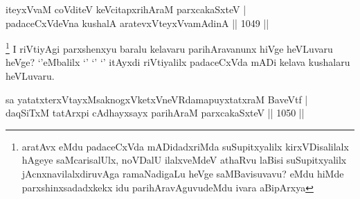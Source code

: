 \begin{shl}
iteyxVvaM coVditeV keVcitapxrihAraM parxcakaSxteV | \\
padaceCxVdeVna kushalA aratevxVteyxVvamAdinA \hfill||  1049 ||  
\end{shl}

\begin{artha}
\footnote{aratAvx eMdu padaceCxVda mADidadxriMda suSupitxyalilx kirxVDisalilalx hAgeye saMcarisalUlx, noVDalU ilalxveMdeV athaRvu laBisi suSupitxyalilx jAcnxnavilalxdiruvAga ramaNadigaLu heVge saMBavisuvavu? eMdu hiMde parxshinxsadadxkekx idu parihAravAguvudeMdu ivara aBipArxya}
I riVtiyAgi parxshenxyu baralu kelavaru parihAravanunx hiVge heVLuvaru heVge? `\stext'eMbalilx `\stext' `\stext' `\stext' itAyxdi riVtiyalilx padaceCxVda mADi kelava kushalaru heVLuvaru.
\end{artha}

 
 \begin{shl}
sa yatatxterxVtayxMsaknogxVketxVneVRdamapuyxtatxraM BaveVtf | \\
daqSiTxM tatArxpi cAdhayxsayx parihAraM parxcakaSxteV \hfill||  1050 ||  
\end{shl}
 
